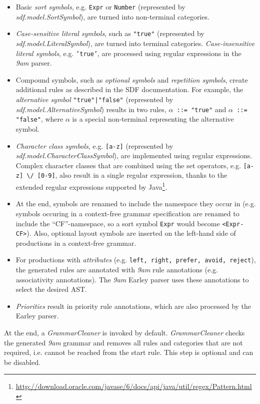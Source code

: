 \documentclass[article,linedtoc,colorback,accentcolor=tud4c,10pt]{tudreport}
\newcommand{\J}[1]{\textit{#1}}
\newcommand{\C}[1]{\texttt{#1}}
\newcommand{\Jclass}[1]{\J{#1}}
\begin{document}
\begin{itemize}
\item Basic \emph{sort symbols}, e.g. \C{Expr} or \C{Number} (represented by \J{sdf.model.SortSymbol}), are turned into non-terminal categories.
\item \emph{Case-sensitive literal symbols}, such as \C{"true"} (represented by \J{sdf.model.LiteralSymbol}), are turned into terminal categories. \emph{Case-insensitive literal symbols}, e.g. \C{'true'}, are processed using regular expressions in the \emph{9am} parser.
\item Compound symbols, such as \emph{optional symbols} and \emph{repetition symbols}, create additional rules as described in the SDF documentation. For example, the \emph{alternative symbol} \C{"true"|"false"} (represented by \J{sdf.model.AlternativeSymbol}) results in two rules, \C{$\alpha$ ::= "true"} and \C{$\alpha$ ::= "false"}, where $\alpha$ is a special non-terminal representing the alternative symbol.
\item \emph{Character class symbols}, e.g. \C{[a-z]} (represented by \J{sdf.model.CharacterClassSymbol}), are implemented using regular expressions. Complex character classes that are combined using the set operators, e.g. \C{[a-z] \textbackslash/ [0-9]}, also result in a single regular expression, thanks to the extended regular expressions supported by Java\footnote{\url{http://download.oracle.com/javase/6/docs/api/java/util/regex/Pattern.html}}.
\item At the end, symbols are renamed to include the namespace they occur in (e.g. symbols occuring in a context-free grammar specification are renamed to include the ``CF''-namespace, so a sort symbol \C{Expr} would become \C{<Expr-CF>}). Also, optional layout symbols are inserted on the left-hand side of productions in a context-free grammar.
\item For productions with \emph{attributes} (e.g. \C{left, right, prefer, avoid, reject}), the generated rules are annotated with \emph{9am} rule annotations (e.g. associativity annotations). The \emph{9am} Earley parser uses these annotations to select the desired AST.
\item \emph{Priorities} result in priority rule annotations, which are also processed by the Earley parser.
\end{itemize}

At the end, a \Jclass{GrammarCleaner} is invoked by default. \Jclass{GrammarCleaner} checks the generated \emph{9am} grammar and removes all rules and categories that are not required, i.e. cannot be reached from the start rule. This step is optional and can be disabled.
\end{document}
